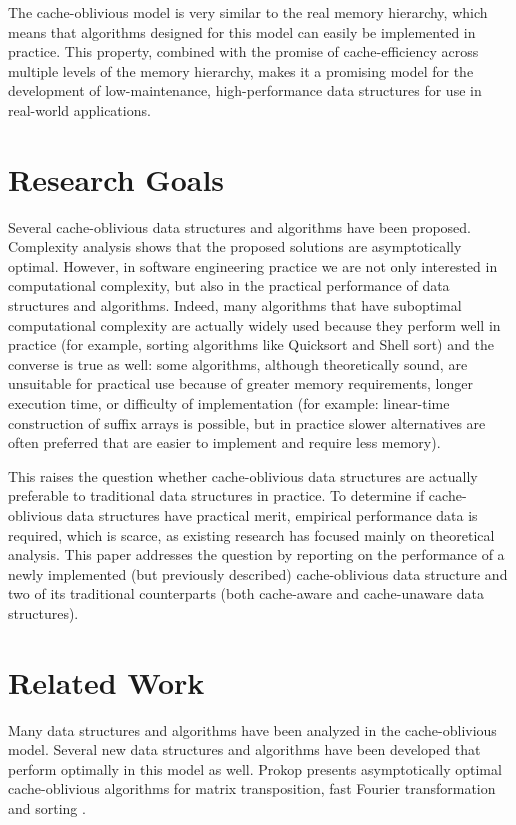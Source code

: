 \documentclass{acm_proc_article-sp}
\begin{document}
The cache-oblivious model is very similar to the real memory hierarchy,
which means that algorithms designed for this model can
easily be implemented in practice. This property, combined with the
promise of cache-efficiency across multiple levels of the memory hierarchy,
makes it a promising model for the development of low-maintenance,
high-performance data structures for use in real-world applications.

\section{Research Goals}
Several cache-oblivious data structures and algorithms have been proposed. Complexity analysis shows that the proposed solutions are asymptotically optimal. However, in software engineering practice we are not only interested in computational complexity, but also in the practical performance of data structures and algorithms. Indeed, many algorithms that have suboptimal computational complexity are actually widely used because they perform well in practice (for example, sorting algorithms like Quicksort and Shell sort) and the converse is true as well: some algorithms, although theoretically sound, are unsuitable for practical use because of greater memory requirements, longer execution time, or difficulty of implementation (for example: linear-time construction of suffix arrays is possible, but in practice slower alternatives are often preferred that are easier to implement and require less memory).

This raises the question whether cache-oblivious data structures are actually preferable to traditional data structures in practice. To determine if cache-oblivious data structures have practical merit, empirical performance data is required, which is scarce, as existing research has focused mainly on theoretical analysis.
This paper addresses the question by reporting on the performance of a newly
implemented (but previously described) cache-oblivious data structure and two
of its traditional counterparts (both cache-aware and cache-unaware data
structures).

\section{Related Work}
\label{sect-related-work}
Many data structures and algorithms have been analyzed in the cache-oblivious model. Several new data structures and algorithms have been developed that perform optimally in this mo\-del as well. Prokop presents asymptotically optimal cache-oblivious algorithms for matrix transposition, fast Fourier transformation and sorting \cite{prokop1999coa}.
\end{document}
